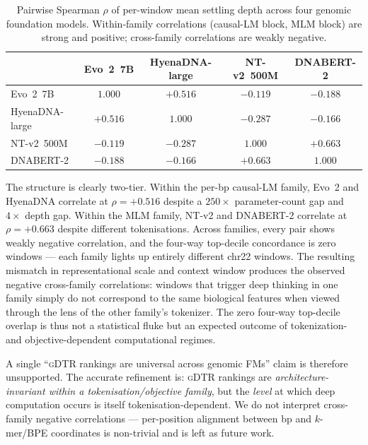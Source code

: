 \documentclass{article}
\theoremstyle{plain}
\theoremstyle{definition}
\theoremstyle{remark}
\newcommand{\gDTR}{\textsc{gDTR}}
\begin{document}
\begin{table}[t]
\caption{Pairwise Spearman $\rho$ of per-window mean settling depth
across four genomic foundation models. Within-family correlations
(causal-LM block, MLM block) are strong and positive; cross-family
correlations are weakly negative.}
\label{tab:cross-arch}
\centering
\small
\begin{tabular}{@{}lcccc@{}}
\toprule
 & Evo~2~7B & HyenaDNA-large & NT-v2~500M & DNABERT-2 \\
\midrule
Evo~2~7B         & $1.000$ & $+0.516$ & $-0.119$ & $-0.188$ \\
HyenaDNA-large   & $+0.516$ & $1.000$ & $-0.287$ & $-0.166$ \\
NT-v2~500M       & $-0.119$ & $-0.287$ & $1.000$ & $+0.663$ \\
DNABERT-2        & $-0.188$ & $-0.166$ & $+0.663$ & $1.000$ \\
\bottomrule
\end{tabular}
\end{table}

The structure is clearly two-tier. Within the per-bp causal-LM family,
Evo~2 and HyenaDNA correlate at $\rho=+0.516$ despite a $250\times$
parameter-count gap and $4\times$ depth gap. Within the MLM family,
NT-v2 and DNABERT-2 correlate at $\rho=+0.663$ despite different
tokenisations. Across families, every pair shows weakly negative
correlation, and the four-way top-decile concordance is zero windows
--- each family lights up entirely different chr22 windows. The
resulting mismatch in representational scale and context window
produces the observed negative cross-family correlations: windows that
trigger deep thinking in one family simply do not correspond to the
same biological features when viewed through the lens of the other
family's tokenizer. The zero four-way top-decile overlap is thus not a
statistical fluke but an expected outcome of tokenization- and
objective-dependent computational regimes.

A single ``\gDTR{} rankings are universal across genomic FMs'' claim
is therefore unsupported. The accurate refinement is: \gDTR{} rankings
are \emph{architecture-invariant within a tokenisation/objective
family}, but the \emph{level} at which deep computation occurs is
itself tokenisation-dependent. We do not interpret cross-family
negative correlations --- per-position alignment between bp and
$k$-mer/BPE coordinates is non-trivial and is left as future work.
\end{document}
